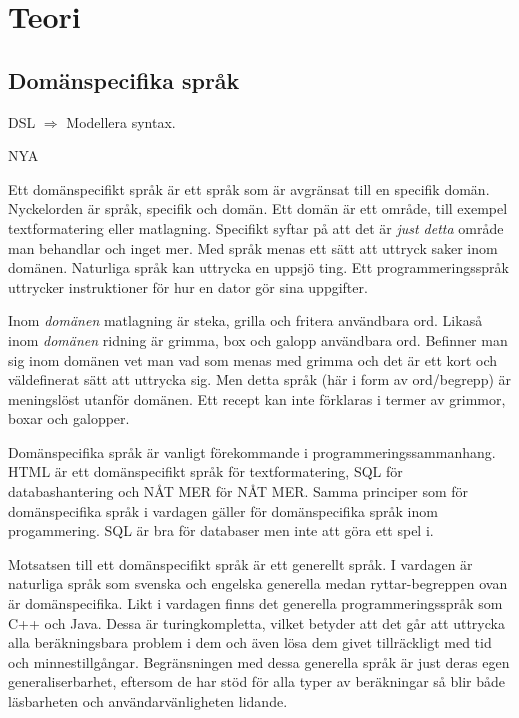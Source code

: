 
\chapter{Teori}

\section{Domänspecifika språk}
\begin{binge}
DSL $\Rightarrow$ Modellera syntax.
\end{binge}
\begin{draft}

NYA

Ett domänspecifikt språk är ett språk som är avgränsat till en specifik domän. Nyckelorden är språk, specifik och domän. Ett domän är ett område, till exempel textformatering eller matlagning. Specifikt syftar på att det är \textit{just detta} område man behandlar och inget mer. Med språk menas ett sätt att uttryck saker inom domänen. Naturliga språk kan uttrycka en uppsjö ting. Ett programmeringsspråk uttrycker instruktioner för hur en dator gör sina uppgifter.

Inom \textit{domänen} matlagning är steka, grilla och fritera användbara ord. Likaså inom \textit{domänen} ridning är grimma, box och galopp användbara ord. Befinner man sig inom domänen vet man vad som menas med grimma och det är ett kort och väldefinerat sätt att uttrycka sig. Men detta språk (här i form av ord/begrepp) är meningslöst utanför domänen. Ett recept kan inte förklaras i termer av grimmor, boxar och galopper.

Domänspecifika språk är vanligt förekommande i programmeringssammanhang. HTML är ett domänspecifikt språk för textformatering, SQL för databashantering och NÅT MER för NÅT MER. Samma principer som för domänspecifika språk i vardagen gäller för domänspecifika språk inom progammering. SQL är bra för databaser men inte att göra ett spel i.

Motsatsen till ett domänspecifikt språk är ett generellt språk. I vardagen är naturliga språk som svenska och engelska generella medan ryttar-begreppen ovan är domänspecifika. Likt i vardagen finns det generella programmeringsspråk som C++ och Java. Dessa är turingkompletta, vilket betyder att det går att uttrycka alla beräkningsbara problem i dem och även lösa dem givet tillräckligt med tid och  minnestillgångar. Begränsningen med dessa generella språk är just deras egen generaliserbarhet, eftersom de har stöd för alla typer av beräkningar så blir både läsbarheten och användarvänligheten lidande.


\end{draft}
